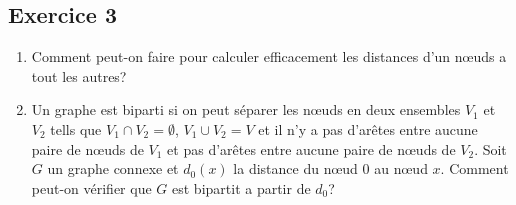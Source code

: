 \subsection*{Exercice 3}

\begin{enumerate}
 \item Comment peut-on faire pour calculer efficacement les distances d'un n\oe{}uds a tout les autres?
 \item Un graphe est biparti si on peut s\'{e}parer les n\oe{}uds en deux ensembles $V_1$ et $V_2$ tells que
 $V_1 \cap V_2 = \emptyset$, $V_1 \cup V_2 = V$ et il n'y a pas d'ar\^{e}tes entre aucune paire de n\oe{}uds de $V_1$ et
 pas d'ar\^{e}tes entre aucune paire de n\oe{}uds de $V_2$. Soit $G$ un graphe connexe et $d_0(x)$ la distance du n\oe{}ud
 $0$ au n\oe{}ud $x$. Comment peut-on v\'{e}rifier que $G$ est bipartit a partir de $d_0$?
\end{enumerate}

